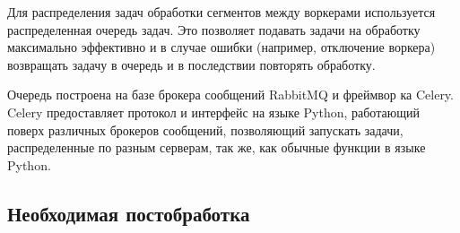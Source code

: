 Для распределения задач обработки сегментов между воркерами используется распределенная очередь задач. Это позволяет подавать задачи на обработку максимально эффективно и в случае ошибки (например, отключение воркера) возвращать задачу в очередь и в последствии повторять обработку.

Очередь построена на базе брокера сообщений RabbitMQ\cite{rabbitmq_website} и фреймвор
ка Celery\cite{celery_website}. Celery предоставляет протокол и интерфейс на языке Python, работающий поверх различных брокеров сообщений, позволяющий запускать задачи, распределенные по разным серверам, так же, как обычные функции в языке Python.

\subsection{Необходимая постобработка}